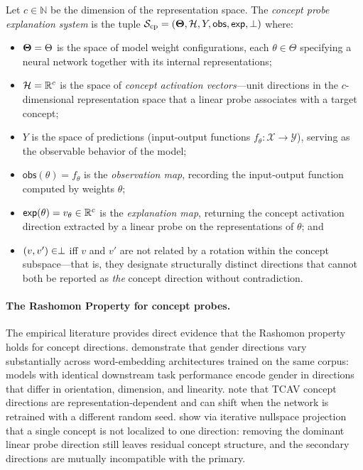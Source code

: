 \begin{definition}
\label{def:concept-system}
Let $c \in \mathbb{N}$ be the dimension of the representation space.  The
\emph{concept probe explanation system} is the tuple
$\mathcal{S}_{\mathrm{cp}} = (\mathbf{\Theta}, \mathcal{H}, Y, \mathsf{obs}, \mathsf{exp}, \perp)$ where:
\begin{itemize}
  \item $\mathbf{\Theta} = \Theta$ is the space of model weight configurations,
    each $\theta \in \Theta$ specifying a neural network together with its
    internal representations;
  \item $\mathcal{H} = \mathbb{R}^c$ is the space of \emph{concept activation vectors}---unit
    directions in the $c$-dimensional representation space that a linear probe
    associates with a target concept;
  \item $Y$ is the space of predictions (input-output functions
    $f_\theta : \mathcal{X} \to \mathcal{Y}$), serving as the observable
    behavior of the model;
  \item $\mathsf{obs}(\theta) = f_\theta$ is the \emph{observation map},
    recording the input-output function computed by weights $\theta$;
  \item $\mathsf{exp}(\theta) = v_\theta \in \mathbb{R}^c$ is the \emph{explanation
    map}, returning the concept activation direction extracted by a linear
    probe on the representations of $\theta$; and
  \item $(v, v') \in \perp$ iff $v$ and $v'$ are not related by a rotation
    within the concept subspace---that is, they designate structurally distinct
    directions that cannot both be reported as \emph{the} concept direction
    without contradiction.
\end{itemize}
\end{definition}

\paragraph{The Rashomon Property for concept probes.}
The empirical literature provides direct evidence that the Rashomon property
holds for concept directions.  \citet{bolukbasi2016man} demonstrate that gender
directions vary substantially across word-embedding architectures trained on the
same corpus: models with identical downstream task performance encode gender in
directions that differ in orientation, dimension, and linearity.
\citet{kim2018tcav} note that TCAV concept directions are representation-dependent
and can shift when the network is retrained with a different random seed.
\citet{ravfogel2020null} show via iterative nullspace projection that a single
concept is not localized to one direction: removing the dominant linear probe
direction still leaves residual concept structure, and the secondary directions
are mutually incompatible with the primary.

